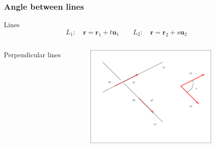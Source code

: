 \begin{frame}
\frametitle{Angle between lines}
Lines
    $$L_1: \quad \textbf{r}= \textbf{r}_1+t\textbf{u}_1 \qquad L_2: \quad \textbf{r}= \textbf{r}_2+s\textbf{u}_2$$

  \begin{columns}[t]
    \column[T]{6cm}
    \textcolor[rgb]{0.98,0.00,0.00}{Perpendicular} lines\\
    \column{6.5cm}
    \begin{figure}
        \includegraphics[height=2in]{../../modules/vectors/pictures/ok-angle_line_line.eps}
    \end{figure}
  \end{columns}
\end{frame}